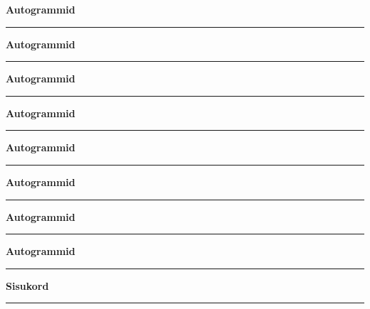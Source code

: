 \documentclass[12pt]{extbook}
\begin{document}
\vspace{-0.05in}
\pagebreak[3]
\null
\clearpage
{
  \samepage
  \raggedbottom
  \raggedright
  \sloppy
  \centerline{ {\bf {\large Autogrammid}}}
  \vspace{0.1in}
  \hrule height 0.05ex
}\null
\clearpage
{
  \samepage
  \raggedbottom
  \raggedright
  \sloppy
  \centerline{ {\bf {\large Autogrammid}}}
  \vspace{0.1in}
  \hrule height 0.05ex
}\null
\clearpage
{
  \samepage
  \raggedbottom
  \raggedright
  \sloppy
  \centerline{ {\bf {\large Autogrammid}}}
  \vspace{0.1in}
  \hrule height 0.05ex
}\null
\clearpage
{
  \samepage
  \raggedbottom
  \raggedright
  \sloppy
  \centerline{ {\bf {\large Autogrammid}}}
  \vspace{0.1in}
  \hrule height 0.05ex
}\null
\clearpage
{
  \samepage
  \raggedbottom
  \raggedright
  \sloppy
  \centerline{ {\bf {\large Autogrammid}}}
  \vspace{0.1in}
  \hrule height 0.05ex
}\null
\clearpage
{
  \samepage
  \raggedbottom
  \raggedright
  \sloppy
  \centerline{ {\bf {\large Autogrammid}}}
  \vspace{0.1in}
  \hrule height 0.05ex
}\null
\clearpage
{
  \samepage
  \raggedbottom
  \raggedright
  \sloppy
  \centerline{ {\bf {\large Autogrammid}}}
  \vspace{0.1in}
  \hrule height 0.05ex
}\null
\clearpage
{
  \samepage
  \raggedbottom
  \raggedright
  \sloppy
  \centerline{ {\bf {\large Autogrammid}}}
  \vspace{0.1in}
  \hrule height 0.05ex
}

\begin{flushleft}
\begin{onecolumn}
  {
    \sloppy
    \centerline{ {\bf {\large Sisukord } } }
    \vspace{0.1in}
    \hrule height 0.05ex
  }
\printindex
\end{onecolumn}
\end{flushleft}
\end{document}
